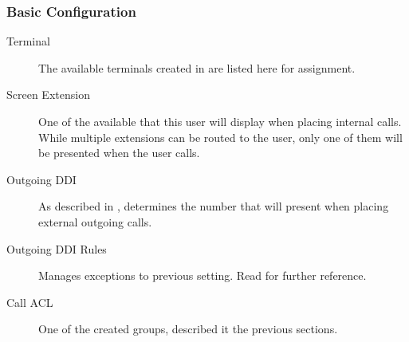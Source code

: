\documentclass[letterpaper,10pt,english]{sphinxmanual}
\begin{document}
\subsubsection{Basic Configuration}
\label{administration_portal/client/vpbx/users:basic-configuration}\begin{description}
\item[{Terminal}] \leavevmode{}\label{administration_portal/client/vpbx/users:term-terminal}
The available terminals created in {\hyperref[administration_portal/client/vpbx/terminals:terminals]{}} are listed here
for assignment.

\item[{Screen Extension}] \leavevmode{}\label{administration_portal/client/vpbx/users:term-screen-extension}
One of the available {\hyperref[administration_portal/client/vpbx/extensions:extensions]{}} that this user will display when
placing internal calls. While multiple extensions can be routed to the
user, only one of them will be presented when the user calls.

\item[{Outgoing DDI}] \leavevmode{}\label{administration_portal/client/vpbx/users:term-outgoing-ddi}
As described in {\hyperref[getting_started/external_outgoing_calls/outgoing_ddi:external\string-ddi]{}}, determines the number that will
present when placing external outgoing calls.

\item[{Outgoing DDI Rules}] \leavevmode{}\label{administration_portal/client/vpbx/users:term-outgoing-ddi-rules}
Manages exceptions to previous setting. Read {\hyperref[administration_portal/client/vpbx/user_configuration/outgoing_ddi_rules:outgoingddi\string-rules]{}}
for further reference.

\item[{Call ACL}] \leavevmode{}\label{administration_portal/client/vpbx/users:term-call-acl}
One of the created {\hyperref[administration_portal/client/vpbx/user_configuration/call_acls:call\string-permissions]{}} groups, described
it the previous sections.


\end{description}
\end{document}
